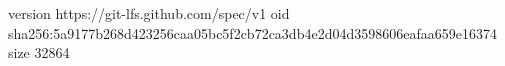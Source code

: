 version https://git-lfs.github.com/spec/v1
oid sha256:5a9177b268d423256caa05bc5f2cb72ca3db4e2d04d3598606eafaa659e16374
size 32864
